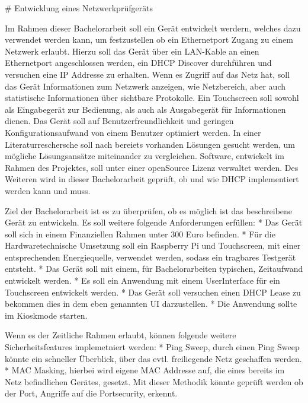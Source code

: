 # Entwicklung eines Netzwerkprüfgeräts

Im Rahmen dieser Bachelorarbeit soll ein Gerät entwickelt werdern, welches dazu verwendet werden kann, um festzustellen ob ein Ethernetport Zugang zu einem Netzwerk erlaubt. Hierzu soll das Gerät über ein LAN-Kable an einen Ethernetport angeschlossen werden, ein DHCP Discover durchführen und versuchen eine IP Addresse zu erhalten.  
Wenn es Zugriff auf das Netz hat, soll das Gerät Informationen zum Netzwerk anzeigen, wie Netzbereich, aber auch statistische Informationen über sichtbare Protokolle.  
Ein Touchscreen soll sowohl als Eingabegerät zur Bedienung, als auch als Ausgabegerät für Informationen dienen.  
Das Gerät soll auf Benutzerfreundlichkeit und geringen Konfigurationsaufwand von einem Benutzer optimiert werden.  
In einer Literaturreschersche soll nach bereiets vorhanden Lösungen gesucht werden, um mögliche Lösungsansätze miteinander zu vergleichen.  
Software, entwickelt im Rahmen des Projektes, soll unter einer openSource Lizenz verwaltet werden.
Des Weiteren wird in dieser Bachelorarbeit geprüft, ob und wie DHCP implementiert werden kann und muss. 

Ziel der Bachelorarbeit ist es zu überprüfen, ob es möglich ist das beschreibene Gerät zu entwickeln. Es soll weitere folgende Anforderungen erfüllen:  
* Das Gerät soll sich in einem Finanziellen Rahmen unter 300 Euro befinden.  
* Für die Hardwaretechnische Umsetzung soll ein Raspberry Pi und Touchscreen, mit einer entsprechenden Energiequelle, verwendet werden, sodass ein tragbares Testgerät entsteht.  
* Das Gerät soll mit einem, für Bachelorarbeiten typischen, Zeitaufwand entwickelt werden.  
* Es soll ein Anwendung mit einem UserInterface für ein Touchscreen entwickelt werden.  
* Das Gerät soll versuchen einen DHCP Lease zu bekommen dies in dem eben genannten UI darzustellen.  * Die Anwendung sollte im Kioskmode starten.  

Wenn es der Zeitliche Rahmen erlaubt, können folgende weitere Sicherheitsfeatures implemetniert werden:  
* Ping Sweep, durch einen Ping Sweep könnte ein schneller Überblick, über das evtl. freiliegende Netz geschaffen werden.  
* MAC Masking, hierbei wird eigene MAC Addresse auf, die eines bereits im Netz befindlichen Gerätes, gesetzt. Mit dieser Methodik könnte geprüft werden ob der Port, Angriffe auf die Portsecurity, erkennt.
